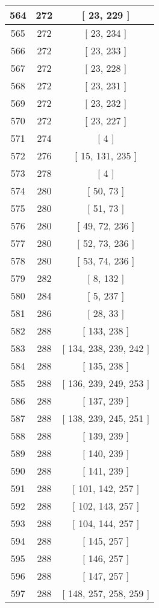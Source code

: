 \begin{center}
\begin{longtable}[H]{|| c c c ||}
564 & 272 & [ 23, 229 ] \\ 
\hline
565 & 272 & [ 23, 234 ] \\ 
\hline
566 & 272 & [ 23, 233 ] \\ 
\hline
567 & 272 & [ 23, 228 ] \\ 
\hline
568 & 272 & [ 23, 231 ] \\ 
\hline
569 & 272 & [ 23, 232 ] \\ 
\hline
570 & 272 & [ 23, 227 ] \\ 
\hline
571 & 274 & [ 4 ] \\ 
\hline
572 & 276 & [ 15, 131, 235 ] \\ 
\hline
573 & 278 & [ 4 ] \\ 
\hline
574 & 280 & [ 50, 73 ] \\ 
\hline
575 & 280 & [ 51, 73 ] \\ 
\hline
576 & 280 & [ 49, 72, 236 ] \\ 
\hline
577 & 280 & [ 52, 73, 236 ] \\ 
\hline
578 & 280 & [ 53, 74, 236 ] \\ 
\hline
579 & 282 & [ 8, 132 ] \\ 
\hline
580 & 284 & [ 5, 237 ] \\ 
\hline
581 & 286 & [ 28, 33 ] \\ 
\hline
582 & 288 & [ 133, 238 ] \\ 
\hline
583 & 288 & [ 134, 238, 239, 242 ] \\ 
\hline
584 & 288 & [ 135, 238 ] \\ 
\hline
585 & 288 & [ 136, 239, 249, 253 ] \\ 
\hline
586 & 288 & [ 137, 239 ] \\ 
\hline
587 & 288 & [ 138, 239, 245, 251 ] \\ 
\hline
588 & 288 & [ 139, 239 ] \\ 
\hline
589 & 288 & [ 140, 239 ] \\ 
\hline
590 & 288 & [ 141, 239 ] \\ 
\hline
591 & 288 & [ 101, 142, 257 ] \\ 
\hline
592 & 288 & [ 102, 143, 257 ] \\ 
\hline
593 & 288 & [ 104, 144, 257 ] \\ 
\hline
594 & 288 & [ 145, 257 ] \\ 
\hline
595 & 288 & [ 146, 257 ] \\ 
\hline
596 & 288 & [ 147, 257 ] \\ 
\hline
597 & 288 & [ 148, 257, 258, 259 ] \\ 

\end{longtable}
\end{center}
